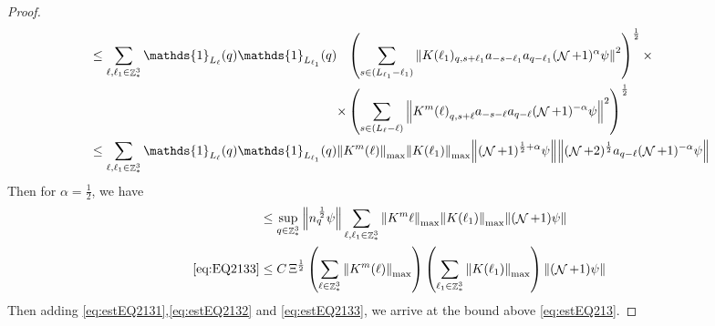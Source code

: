 \documentclass[sn-mathphys, Numbered ,a4paper]{sn-jnl}%
\DeclareMathOperator{\Z}{\mathbb{Z}}
\DeclareMathOperator{\NN}{\mathcal{N}}
\newcommand{\half}{\frac{1}{2}}
\theoremstyle{plain}
\theoremstyle{definition}
\theoremstyle{remark}
\theoremstyle{plain}
\theoremstyle{definition}
\theoremstyle{remark}
\begin{document}
\begin{proof}
\begin{align}
    &\leq \sum\limits_{\ell, \ell_1\in \Z^3_*} \mathds{1}_{L_{\ell}}(q) \mathds{1}_{L_{\ell_1}}(q) \begin{aligned}[t]&\left(\sum\limits_{ s \in  (L_{\ell_1}-\ell_1)} \norm{K(\ell_1)_{q,s+\ell_1} a_{-s-\ell_1} a_{q-\ell_1}  (\NN+1)^{\alpha}\psi}^2\right)^\half \times \nonumber\\ \times &\left( \sum\limits_{ s \in (L_{\ell}-\ell) } \norm{ K^m{(\ell)}_{q,s+\ell}  a_{-s-\ell} a_{q-\ell} (\NN+1)^{-\alpha} \psi }^2\right)^\half \end{aligned}\nonumber\\
    &\leq \sum\limits_{\ell, \ell_1\in \Z^3_*} \mathds{1}_{L_{\ell}}(q) \mathds{1}_{L_{\ell_1}}(q) \norm{K^m{(\ell)}}_{\mathrm{max}} \norm{K(\ell_1)}_{\mathrm{max}} \norm{ (\NN+1)^{\half+\alpha}\psi} \norm{  (\NN+2)^\half  a_{q-\ell} (\NN+1)^{-\alpha} \psi } \nonumber
\end{align} 
Then for $\alpha = \half$, we have
\begin{align}
	&\leq  \sup\limits_{q \in \Z^3_*} \norm{ n_{q}^{\,\half} \psi } \sum\limits_{\ell, \ell_1\in \Z^3_*}  \norm{K^m{\ell}}_{\mathrm{max}} \norm{K(\ell_1)}_{\mathrm{max}} \norm{ (\NN+1) \psi}  \nonumber\\
	\eqref{eq:EQ2133}&\leq C\, \Xi^\half \left(\sum\limits_{\ell\in \Z^3_*} \norm{K^m(\ell)}_{\mathrm{max}}\right)\left(  \sum\limits_{ \ell_1\in \Z^3_*}  \norm{ K(\ell_1)}_{\mathrm{max}} \right) \norm{ (\NN+1) \psi}\label{eq:estEQ2133} 
\end{align}
Then adding \eqref{eq:estEQ2131},\eqref{eq:estEQ2132} and \eqref{eq:estEQ2133}, we arrive at the bound above \eqref{eq:estEQ213}.
\end{proof}
\end{document}

